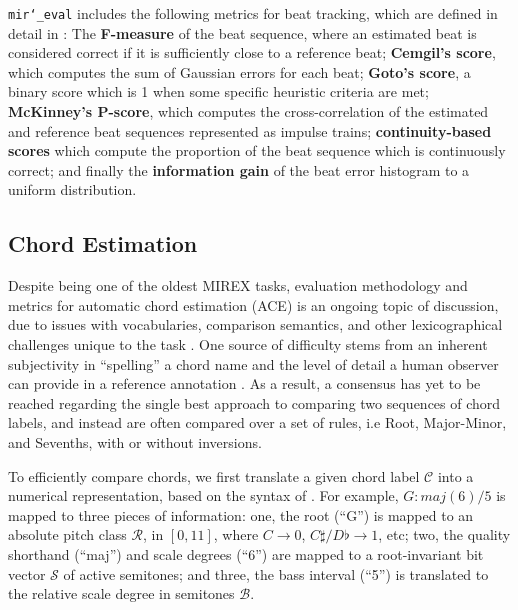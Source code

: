 \documentclass{article}
\def\mireval{\texttt{mir\char`_eval}}
\begin{document}
\mireval{} includes the following metrics for beat tracking, which are defined in detail in \cite{davies2009evaluation}:
The \textbf{F-measure} of the beat sequence, where an estimated beat is considered correct if it is sufficiently close to a reference beat;
\textbf{Cemgil's score}, which computes the sum of Gaussian errors for each beat;
\textbf{Goto's score}, a binary score which is 1 when some specific heuristic criteria are met;
\textbf{McKinney's P-score}, which computes the cross-correlation of the estimated and reference beat sequences represented as impulse trains;
\textbf{continuity-based scores} which compute the proportion of the beat sequence which is continuously correct;
and finally the \textbf{information gain} of the beat error histogram to a uniform distribution.

\subsection{Chord Estimation}


Despite being one of the oldest MIREX tasks, evaluation methodology and metrics for automatic chord estimation (ACE) is an ongoing topic of discussion, due to issues with vocabularies, comparison semantics, and other lexicographical challenges unique to the task \cite{Peeters2013}.
One source of difficulty stems from an inherent subjectivity in ``spelling'' a chord name and the level of detail a human observer can provide in a reference annotation \cite{McVicar}.
As a result, a consensus has yet to be reached regarding the single best approach to comparing two sequences of chord labels, and instead are often compared over a set of rules, i.e Root, Major-Minor, and Sevenths, with or without inversions.

To efficiently compare chords, we first translate a given chord label $\mathcal{C}$ into a numerical representation, based on the syntax of \cite{Harte2010}.
For example, $G:maj(6)/5$ is mapped to three pieces of information: one, the root (``G'') is mapped to an absolute pitch class $\mathcal{R}$, in $[0, 11]$, where $C\to0$, $C\sharp/D\flat\to1$, etc; two, the quality shorthand (``maj'') and scale degrees (``6'') are mapped to a root-invariant bit vector $\mathcal{S}$ of active semitones; and three, the bass interval (``5'') is translated to the relative scale degree in semitones $\mathcal{B}$.
\end{document}
